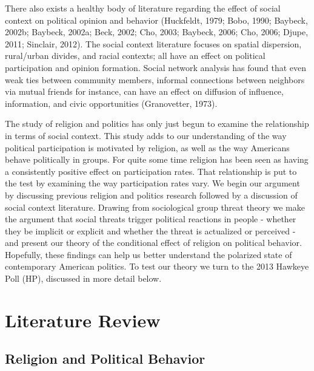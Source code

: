 \documentclass{article}
\begin{document}
There also exists a healthy body of literature regarding the effect of social context on political opinion and behavior (Huckfeldt, 1979; Bobo, 1990; Baybeck, 2002b; Baybeck, 2002a; Beck, 2002; Cho, 2003; Baybeck, 2006; Cho, 2006; Djupe, 2011; Sinclair, 2012).  The social context literature focuses on spatial dispersion, rural/urban divides, and racial contexts; all have an effect on political participation and opinion formation.  Social network analysis has found that even weak ties between community members, informal connections between neighbors via mutual friends for instance, can have an effect on diffusion of influence, information, and civic opportunities (Granovetter, 1973).

The study of religion and politics has only just begun to examine the relationship in terms of social context.  This study adds to our understanding of the way political participation is motivated by religion, as well as the way Americans behave politically in groups.  For quite some time religion has been seen as having a consistently positive effect on participation rates.  That relationship is put to the test by examining the way participation rates vary.  We begin our argument by discussing previous religion and politics research followed by a discussion of social context literature.  Drawing from sociological group threat theory we make the argument that social threats trigger political reactions in people - whether they be implicit or explicit and whether the threat is actualized or perceived - and present our theory of the conditional effect of religion on political behavior.  Hopefully, these findings can help us better understand the polarized state of contemporary American politics.  To test our theory we turn to the 2013 Hawkeye Poll (HP), discussed in more detail below.

\section*{Literature Review}
\subsection*{Religion and Political Behavior}
\end{document}
